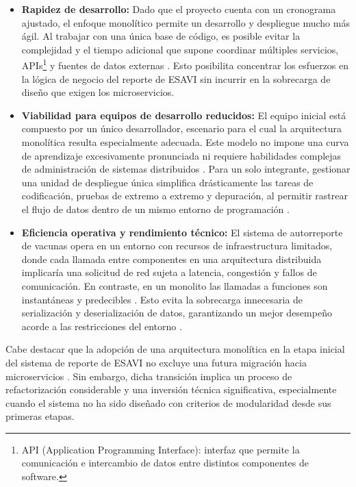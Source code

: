 \begin{itemize}

    \item \textbf{Rapidez de desarrollo:}  Dado que el proyecto cuenta con un cronograma ajustado, el enfoque monolítico permite un desarrollo y despliegue mucho más ágil. 
    Al trabajar con una única base de código, es posible evitar la complejidad y el tiempo adicional que supone coordinar múltiples servicios, APIs\footnote{API (Application Programming Interface): interfaz que permite la comunicación e intercambio de datos entre distintos componentes de software.} y fuentes de datos externas \cite{ibm_microservices_monolith}. 
    Esto posibilita concentrar los esfuerzos en la lógica de negocio del reporte de ESAVI sin incurrir en la sobrecarga de diseño que exigen los microservicios.

    \item \textbf{Viabilidad para equipos de desarrollo reducidos:} El equipo inicial está compuesto por un único desarrollador, escenario para el cual la arquitectura monolítica resulta especialmente adecuada. Este modelo no impone una curva de aprendizaje excesivamente pronunciada ni requiere habilidades complejas de administración de sistemas distribuidos \cite{ibm_microservices_monolith}. 
    Para un solo integrante, gestionar una unidad de despliegue única simplifica drásticamente las tareas de codificación, pruebas de extremo a extremo y depuración, al permitir rastrear el flujo de datos dentro de un mismo entorno de programación \cite{ibm_microservices_monolith}.

    \item \textbf{Eficiencia operativa y rendimiento técnico:} El sistema de autorreporte de vacunas opera en un entorno con recursos de infraestructura limitados, donde cada llamada entre componentes en una arquitectura distribuida implicaría una solicitud de red sujeta a latencia, congestión y fallos de comunicación. En contraste, en un monolito las llamadas a funciones son instantáneas y predecibles \cite{docker_microservices_need}. 
    Esto evita la sobrecarga innecesaria de serialización y deserialización de datos, garantizando un mejor desempeño acorde a las restricciones del entorno \cite{ibm_microservices_monolith}.

\end{itemize}

Cabe destacar que la adopción de una arquitectura monolítica en la etapa inicial del sistema de reporte de ESAVI no excluye una futura migración hacia microservicios \cite{aws_monolith_microservices}.
Sin embargo, dicha transición implica un proceso de refactorización considerable y una inversión técnica significativa, especialmente cuando el sistema no ha sido diseñado con criterios de modularidad desde sus primeras etapas.

